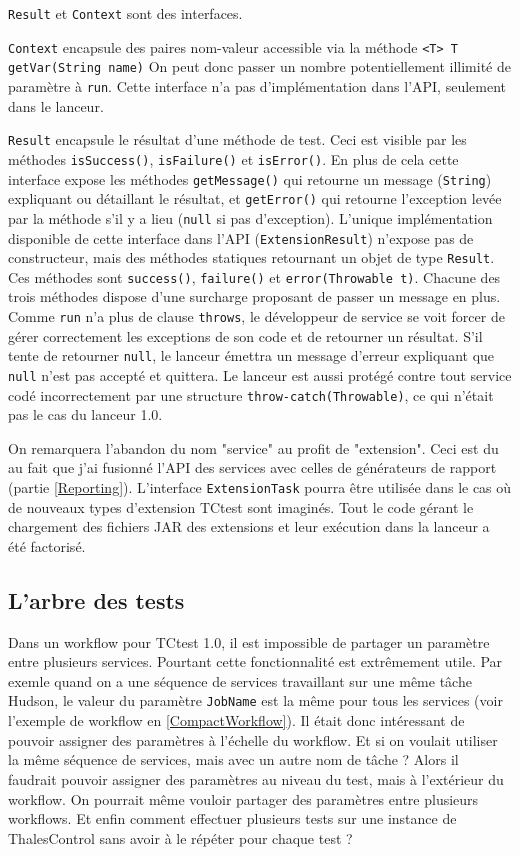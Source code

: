 \verb|Result| et \verb|Context| sont des interfaces. 

\verb|Context| encapsule 
des paires nom-valeur accessible via la méthode 
\verb|<T> T getVar(String name)| On peut donc passer un nombre potentiellement
illimité de paramètre à \verb|run|. Cette interface n'a pas d'implémentation 
dans l'API, seulement dans le lanceur.

\verb|Result| encapsule le résultat d'une 
méthode de test. Ceci est visible par les méthodes \verb|isSuccess()|, 
\verb|isFailure()| et \verb|isError()|. En plus de cela cette interface expose
les méthodes \verb|getMessage()| qui retourne un message (\verb|String|) 
expliquant ou détaillant le résultat, et \verb|getError()| qui retourne 
l'exception levée par la méthode s'il y a lieu (\verb|null| si pas d'exception).
L'unique implémentation disponible de cette interface dans l'API 
(\verb|ExtensionResult|) n'expose pas 
de constructeur, mais des méthodes statiques retournant un objet de type 
\verb|Result|. Ces méthodes sont \verb|success()|, \verb|failure()| et 
\verb|error(Throwable t)|. Chacune des trois méthodes dispose d'une surcharge 
proposant de passer un message en plus. Comme \verb|run| n'a plus de clause 
\verb|throws|, le développeur de service se voit forcer de gérer correctement
les exceptions de son code et de retourner un résultat. S'il tente de retourner
\verb|null|, le lanceur émettra un message d'erreur expliquant que \verb|null| 
n'est pas accepté et quittera. Le lanceur est aussi protégé contre tout service 
codé incorrectement par une structure \verb|throw-catch(Throwable)|, ce qui 
n'était pas le cas du lanceur 1.0.

On remarquera l'abandon du nom "service" au profit de "extension". Ceci est du 
au fait que j'ai fusionné l'API des services avec celles de générateurs de 
rapport (partie \ref{Reporting}). L'interface \verb|ExtensionTask| pourra 
être utilisée dans le cas où de nouveaux types d'extension TCtest sont 
imaginés. Tout le code gérant le chargement des fichiers JAR des extensions et
leur exécution dans la lanceur a été factorisé.

\subsection{L'arbre des tests}
\label{TestTree}

Dans un workflow pour TCtest 1.0, il est impossible de partager un paramètre 
entre plusieurs services. Pourtant cette fonctionnalité est extrêmement utile.
Par exemle quand on a une séquence de services travaillant sur une même tâche 
Hudson, le valeur du paramètre \verb|JobName| est la même pour tous les services
(voir l'exemple de workflow en \ref{CompactWorkflow}). Il était donc intéressant
de pouvoir assigner des 
paramètres à l'échelle du workflow. Et si on voulait utiliser la même séquence 
de services, mais avec un autre nom de tâche ? Alors il faudrait pouvoir 
assigner des paramètres au niveau du test, mais à l'extérieur du workflow. 
On pourrait même vouloir partager des paramètres entre plusieurs workflows.
Et enfin comment effectuer plusieurs tests sur une instance de ThalesControl
sans avoir à le répéter pour chaque test ?

